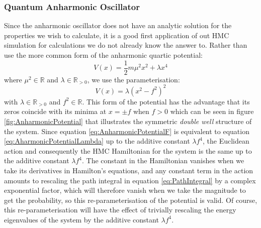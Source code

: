 \documentclass[12pt]{article}
\begin{document}
        \subsubsection{Quantum Anharmonic Oscillator}
            Since the anharmonic oscillator does not have an analytic solution for the properties we wish to calculate, it is a good first application of out HMC simulation for calculations we do not already know the answer to. Rather than use the more common form of the anharmonic quartic potential:
            \begin{equation}
                \label{eq:AharmonicPotentialLambda}
                V\left(x\right) = \frac{1}{2}m\mu^2x^2+\lambda x^4
            \end{equation}
            where $\mu^2 \in\mathbb{R}$ and $\lambda\in\mathbb{R}_{>0}$, we use the parameterisation:
            \begin{equation}
                \label{eq:AnharmonicPotentialF}
                V\left(x\right) = \lambda\left(x^2-f^2\right)^2
            \end{equation}
            with $\lambda\in\mathbb{R}_{>0}$ and $f^2\in\mathbb{R}$. This form of the potential has the advantage that its zeros coincide with its minima at $x=\pm f$ when $f>0$ which can be seen in figure \ref{fig:AnharmonicPotential} that illustrates the symmetric \textit{double well} structure of the system. Since equation \ref{eq:AnharmonicPotentialF} is equivalent to equation \ref{eq:AharmonicPotentialLambda} up to the additive constant $\lambda f^4$, the Euclidean action and consequently the HMC Hamiltonian for the system is the same up to the additive constant $\lambda f^4$. The constant in the Hamiltonian vanishes when we take its derivatives in Hamilton's equations, and any constant term in the action amounts to rescaling the path integral in equation \ref{eq:PathIntegral} by a complex exponential factor, which will therefore vanish when we take the magnitude to get the probability, so this re-parameterisation of the potential is valid. Of course, this re-parameterisation will have the effect of trivially rescaling the energy eigenvalues of the system by the additive constant $\lambda f^4$. 
\end{document}
